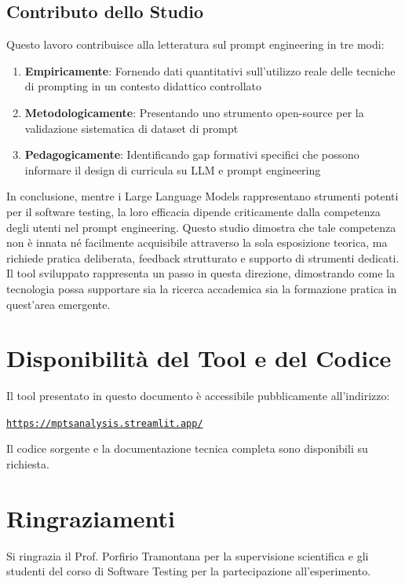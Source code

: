\documentclass[a4paper,12pt]{article}
\begin{document}
\subsection{Contributo dello Studio}
Questo lavoro contribuisce alla letteratura sul prompt engineering in tre modi:
\begin{enumerate}
    \item \textbf{Empiricamente}: Fornendo dati quantitativi sull'utilizzo reale delle tecniche di prompting in un contesto didattico controllato
    \item \textbf{Metodologicamente}: Presentando uno strumento open-source per la validazione sistematica di dataset di prompt
    \item \textbf{Pedagogicamente}: Identificando gap formativi specifici che possono informare il design di curricula su LLM e prompt engineering
\end{enumerate}

\vspace{0.5cm}

In conclusione, mentre i Large Language Models rappresentano strumenti potenti per il software testing, la loro efficacia dipende criticamente dalla competenza degli utenti nel prompt engineering. Questo studio dimostra che tale competenza non è innata né facilmente acquisibile attraverso la sola esposizione teorica, ma richiede pratica deliberata, feedback strutturato e supporto di strumenti dedicati. Il tool sviluppato rappresenta un passo in questa direzione, dimostrando come la tecnologia possa supportare sia la ricerca accademica sia la formazione pratica in quest'area emergente.

\section*{Disponibilità del Tool e del Codice}
Il tool presentato in questo documento è accessibile pubblicamente all'indirizzo:
\begin{center}
\href{https://mptsanalysis.streamlit.app/}{\texttt{https://mptsanalysis.streamlit.app/}}
\end{center}

Il codice sorgente e la documentazione tecnica completa sono disponibili su richiesta.

\section*{Ringraziamenti}
Si ringrazia il Prof. Porfirio Tramontana per la supervisione scientifica e gli studenti del corso di Software Testing per la partecipazione all'esperimento.
\end{document}
